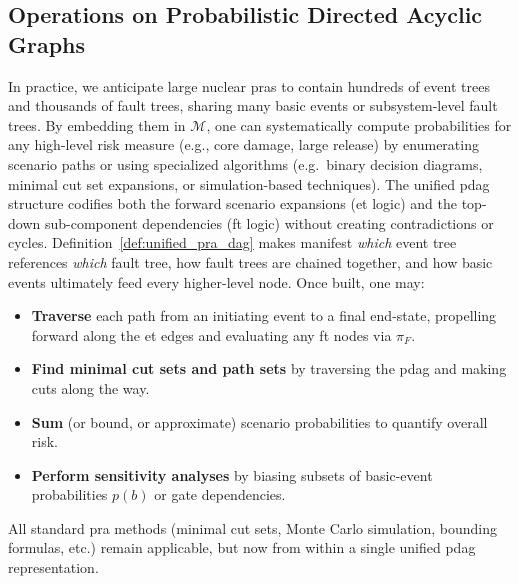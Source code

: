 \subsection{Operations on Probabilistic Directed Acyclic Graphs}
In practice, we anticipate large nuclear \acrshort{pra}s to contain hundreds of event trees and thousands of fault trees, sharing many basic events or subsystem-level fault trees.  By embedding them in \(\mathcal{M}\), one can systematically compute probabilities for any high-level risk measure (e.g., core damage, large release) by enumerating scenario paths or using specialized algorithms (e.g.\ binary decision diagrams, minimal cut set expansions, or simulation-based techniques).  The unified \acrshort{pdag} structure codifies both the forward scenario expansions (\acrshort{et} logic) and the top-down sub-component dependencies (\acrshort{ft} logic) without creating contradictions or cycles. Definition~\ref{def:unified_pra_dag} makes manifest \emph{which} event tree references \emph{which} fault tree, how fault trees are chained together, and how basic events ultimately feed every higher-level node.  Once built, one may:
\begin{itemize}
\item \textbf{Traverse} each path from an initiating event to a final end-state, propelling forward along the \acrshort{et} edges and evaluating any \acrshort{ft} nodes via \(\pi_{F}\).
\item \textbf{Find minimal cut sets and path sets} by traversing the \acrshort{pdag} and making cuts along the way.
\item \textbf{Sum} (or bound, or approximate) scenario probabilities to quantify overall risk.  
\item \textbf{Perform sensitivity analyses} by biasing subsets of basic-event probabilities \(p(b)\) or gate dependencies.
\end{itemize}
All standard \acrshort{pra} methods (minimal cut sets, Monte Carlo simulation, bounding formulas, etc.) remain applicable, but now from within a single unified \acrshort{pdag} representation.